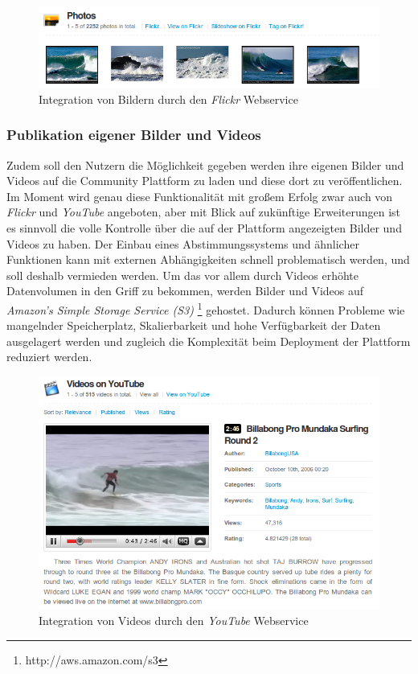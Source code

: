 \begin{figure}[h]
 \includegraphics[width=\textwidth]{bilder/photos-flickr}
 \caption{Integration von Bildern durch den \textit{Flickr}
      Webservice}
 \label{piktogramm}
\end{figure}

\subsubsection{Publikation eigener Bilder und Videos}
Zudem soll den Nutzern die Möglichkeit gegeben werden ihre eigenen
Bilder und Videos auf die Community Plattform zu laden und diese dort
zu veröffentlichen. Im Moment wird genau diese Funktionalität mit
großem Erfolg zwar auch von \textit{Flickr} und \textit{YouTube}
angeboten, aber mit Blick auf zukünftige Erweiterungen ist es sinnvoll
die volle Kontrolle über die auf der Plattform angezeigten Bilder und
Videos zu haben. Der Einbau eines Abstimmungssystems und ähnlicher
Funktionen kann mit externen Abhängigkeiten schnell problematisch
werden, und soll deshalb vermieden werden. Um das vor allem durch
Videos erhöhte Datenvolumen in den Griff zu bekommen, werden Bilder
und Videos auf \textit{Amazon's Simple Storage Service (S3)}
\footnote{http://aws.amazon.com/s3} gehostet. Dadurch können Probleme
wie mangelnder Speicherplatz, Skalierbarkeit und hohe Verfügbarkeit
der Daten ausgelagert werden und zugleich die Komplexität beim
Deployment der Plattform reduziert werden.

\begin{figure}[h]
 \includegraphics[width=\textwidth]{bilder/youtube}
 \caption{Integration von Videos durch den \textit{YouTube}
      Webservice}
 \label{youtube}
\end{figure}

